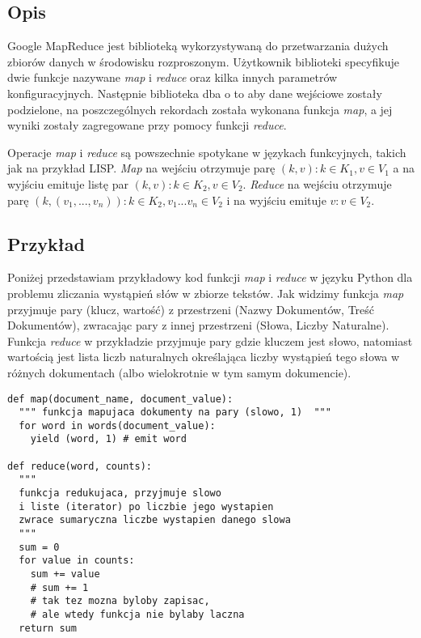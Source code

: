 \subsection*{Opis}

Google MapReduce \cite{google-mapreduce} jest biblioteką wykorzystywaną do przetwarzania dużych zbiorów danych w środowisku rozproszonym.
Użytkownik biblioteki specyfikuje dwie funkcje nazywane \emph{map} i \emph{reduce} oraz kilka innych parametrów konfiguracyjnych.
Następnie biblioteka dba o to aby dane wejściowe zostały podzielone, na poszczególnych rekordach została wykonana funkcja \emph{map}, a jej wyniki zostały zagregowane przy pomocy funkcji \emph{reduce}.

Operacje \emph{map} i \emph{reduce} są powszechnie spotykane w językach funkcyjnych, takich jak na przykład LISP.
\emph{Map} na wejściu otrzymuje parę $(k, v): k \in K_1, v \in V_1$ a na wyjściu emituje listę par $(k, v): k \in K_2, v \in V_2$.
\emph{Reduce} na wejściu otrzymuje parę $(k, (v_1, ..., v_n)): k \in K_2, v_1...v_n \in V_2$ i na wyjściu emituje $v: v \in V_2$.

\subsection*{Przykład}

Poniżej przedstawiam przykładowy kod funkcji \emph{map} i \emph{reduce} w języku Python dla problemu zliczania wystąpień słów w zbiorze tekstów. 
Jak widzimy funkcja \emph{map} przyjmuje pary (klucz, wartość) z przestrzeni (Nazwy Dokumentów, Treść Dokumentów), zwracając pary z innej przestrzeni (Słowa, Liczby Naturalne).
Funkcja \emph{reduce} w przykładzie przyjmuje pary gdzie kluczem jest słowo, natomiast wartością jest lista liczb naturalnych określająca liczby wystąpień tego słowa w różnych dokumentach (albo wielokrotnie w tym samym dokumencie).

\begin{verbatim}
def map(document_name, document_value):
  """ funkcja mapujaca dokumenty na pary (slowo, 1)  """
  for word in words(document_value):
    yield (word, 1) # emit word

def reduce(word, counts):
  """ 
  funkcja redukujaca, przyjmuje slowo 
  i liste (iterator) po liczbie jego wystapien
  zwrace sumaryczna liczbe wystapien danego slowa
  """
  sum = 0
  for value in counts:
    sum += value
    # sum += 1
    # tak tez mozna byloby zapisac, 
    # ale wtedy funkcja nie bylaby laczna     
  return sum 
\end{verbatim}


